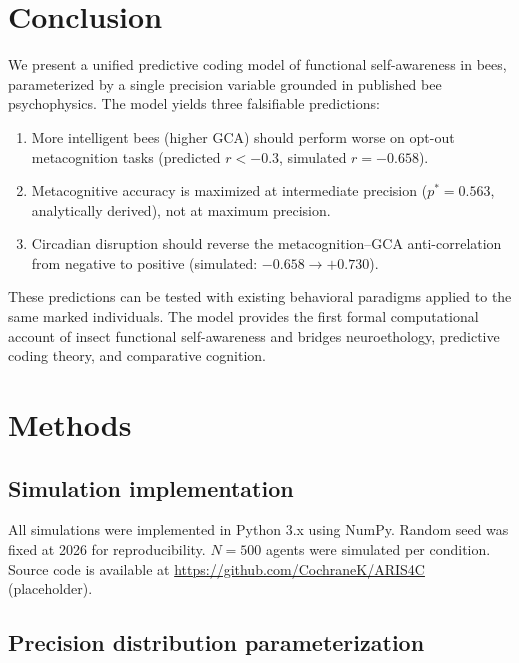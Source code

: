 \documentclass[12pt]{article}
\newcommand{\pstar}{p^*}
\begin{document}
\section{Conclusion}
\label{sec:conclusion}

We present a unified predictive coding model of functional self-awareness in bees, parameterized
by a single precision variable grounded in published bee psychophysics. The model yields three
falsifiable predictions:

\begin{enumerate}
  \item More intelligent bees (higher GCA) should perform worse on opt-out metacognition tasks
    (predicted $r < -0.3$, simulated $r = -0.658$).
  \item Metacognitive accuracy is maximized at intermediate precision ($\pstar = 0.563$,
    analytically derived), not at maximum precision.
  \item Circadian disruption should reverse the metacognition--GCA anti-correlation from negative
    to positive (simulated: $-0.658 \to +0.730$).
\end{enumerate}

These predictions can be tested with existing behavioral paradigms applied to the same marked
individuals. The model provides the first formal computational account of insect functional
self-awareness and bridges neuroethology, predictive coding theory, and comparative cognition.

\section*{Methods}
\label{sec:methods}

\subsection*{Simulation implementation}

All simulations were implemented in Python 3.x using NumPy. Random seed was fixed at 2026 for
reproducibility. $N = 500$ agents were simulated per condition. Source code is available at
\url{https://github.com/CochraneK/ARIS4C} (placeholder).

\subsection*{Precision distribution parameterization}
\end{document}
